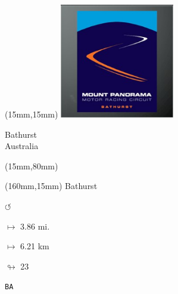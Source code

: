 \begin{textblock*}{50mm}(15mm,15mm)%
\includegraphics[width=50mm]{LG/2015-05-20_00087.png}
\par Bathurst\\ Australia
\end{textblock*}
\begin{textblock*}{185mm}(15mm,80mm)%
\end{textblock*}
\begin{textblock*}{40mm}(160mm,15mm)%
Bathurst
\par \Huge$\circlearrowleft$
\Large
\par$\mapsto$ 3.86 mi.
\par$\mapsto$ 6.21 km
\par$\looparrowright$ 23
\par\hfill\tiny\tt BA\\
\end{textblock*}
\null\newpage

